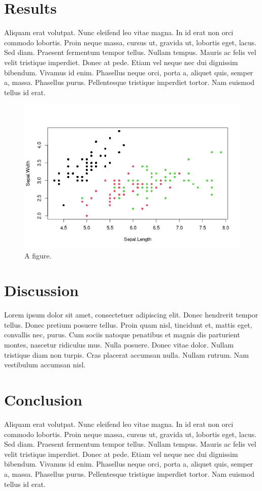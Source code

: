 \documentclass[APA,LATO1COL]{WileyNJD-v2}
\begin{document}
\section{Results}
\label{sec:orgbf24abd}
Aliquam erat volutpat.  Nunc eleifend leo vitae magna.  In id erat non orci commodo lobortis.  Proin neque massa, cursus ut, gravida ut, lobortis eget, lacus.  Sed diam.  Praesent fermentum tempor tellus.  Nullam tempus.  Mauris ac felis vel velit tristique imperdiet.  Donec at pede.  Etiam vel neque nec dui dignissim bibendum.  Vivamus id enim.  Phasellus neque orci, porta a, aliquet quis, semper a, massa.  Phasellus purus.  Pellentesque tristique imperdiet tortor.  Nam euismod tellus id erat.

\begin{figure}[htbp]
\centering
\includegraphics[width=0.6 \textwidth]{figure.png}
\caption{A figure.}
\end{figure}

\section{Discussion}
\label{sec:org7631fc7}
Lorem ipsum dolor sit amet, consectetuer adipiscing elit.  Donec hendrerit tempor tellus.  Donec pretium posuere tellus.  Proin quam nisl, tincidunt et, mattis eget, convallis nec, purus.  Cum sociis natoque penatibus et magnis dis parturient montes, nascetur ridiculus mus.  Nulla posuere.  Donec vitae dolor.  Nullam tristique diam non turpis.  Cras placerat accumsan nulla.  Nullam rutrum.  Nam vestibulum accumsan nisl.

\section{Conclusion}
\label{sec:org3d794a4}
Aliquam erat volutpat.  Nunc eleifend leo vitae magna.  In id erat non orci commodo lobortis.  Proin neque massa, cursus ut, gravida ut, lobortis eget, lacus.  Sed diam.  Praesent fermentum tempor tellus.  Nullam tempus.  Mauris ac felis vel velit tristique imperdiet.  Donec at pede.  Etiam vel neque nec dui dignissim bibendum.  Vivamus id enim.  Phasellus neque orci, porta a, aliquet quis, semper a, massa.  Phasellus purus.  Pellentesque tristique imperdiet tortor.  Nam euismod tellus id erat.

%
\end{document}
